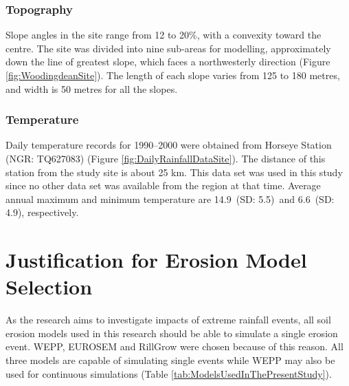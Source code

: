 \subsubsection{Topography}
\label{sec:TopographyData}
Slope angles in the site range from 12 to 20\%, with a convexity toward the
centre. The site was divided into nine sub-areas for modelling, approximately
down the line of greatest slope, which faces a northwesterly direction (Figure
\ref{fig:WoodingdeanSite}). The length of each slope varies from 125 to 180
metres, and width is 50 metres for all the slopes.

\subsubsection{Temperature}
\label{sec:Temperature}

Daily temperature records for 1990--2000 were obtained from Horseye Station
(NGR: TQ627083) (Figure \ref{fig:DailyRainfallDataSite}). The distance of this
station from the study site is about 25 km. This data set was used in this study
since no other data set was available from the region at that time. Average
annual maximum and minimum temperature are 14.9\textcelsius\ (SD:
5.5\textcelsius)\ and 6.6\textcelsius\ (SD: 4.9\textcelsius), respectively.

\section{Justification for Erosion Model Selection}
\label{sec:ModelConfiguration}

As the research aims to investigate impacts of extreme rainfall events, all soil
erosion models used in this research should be able to simulate a single erosion
event. WEPP, EUROSEM and RillGrow were chosen because of this reason. All three
models are capable of simulating single events while WEPP may also be used for
continuous simulations (Table \ref{tab:ModelsUsedInThePresentStudy}).

